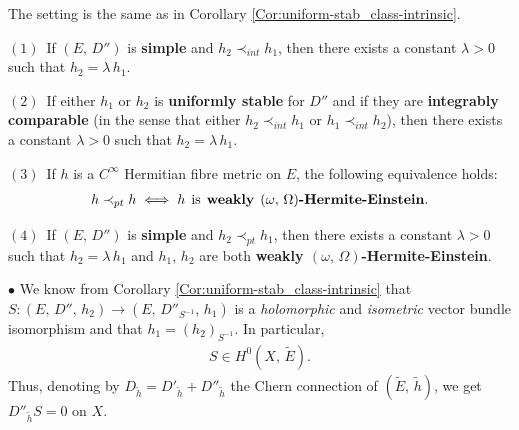 \documentclass[12pt]{article}
\begin{document}
\begin{The}\label{The:h_1-h_2_comparison_proportinality} The setting is the same as in Corollary \ref{Cor:uniform-stab_class-intrinsic}.

\vspace{1ex}

$(1)$\, If $(E,\,D'')$ is {\bf simple} and $h_2\prec_{int} h_1$, then there exists a constant $\lambda>0$ such that $h_2 = \lambda\,h_1$.

\vspace{1ex}

$(2)$\, If either $h_1$ or $h_2$ is {\bf uniformly stable} for $D''$ and if they are {\bf integrably comparable} (in the sense that either $h_2\prec_{int} h_1$ or $h_1\prec_{int} h_2$), then there exists a constant $\lambda>0$ such that $h_2 = \lambda\,h_1$.

\vspace{1ex}

$(3)$\, If $h$ is a $C^\infty$ Hermitian fibre metric on $E$, the following equivalence holds: \begin{eqnarray}\label{eqn:h_prec_h_H-E}h\prec_{pt} h \iff h \hspace{1ex} \mbox{is} \hspace{1ex} \mbox{\bf weakly} \hspace{1ex} (\omega,\,\Omega)\mbox{\bf -Hermite-Einstein}.\end{eqnarray}

\vspace{1ex}

$(4)$\, If $(E,\,D'')$ is {\bf simple} and $h_2\prec_{pt} h_1$, then there exists a constant $\lambda>0$ such that $h_2 = \lambda\,h_1$ and $h_1$, $h_2$ are both {\bf weakly $(\omega,\,\Omega)$-Hermite-Einstein}.


\end{The}

 $\bullet$ We know from Corollary \ref{Cor:uniform-stab_class-intrinsic} that $S:(E,\,D'',\,h_2)\longrightarrow(E,\,D''_{S^{-1}},\,h_1)$ is a {\it holomorphic} and {\it isometric} vector bundle isomorphism and that $h_1 = (h_2)_{S^{-1}}$. In particular, \begin{eqnarray}\label{eqn:S_hol-section_E-tilde}S\in H^0(X,\,\widetilde{E}).\end{eqnarray} Thus, denoting by $D_{\widetilde{h}} = D'_{\widetilde{h}} + D''_{\widetilde{h}}$ the Chern connection of $(\widetilde{E},\,\widetilde{h})$, we get $D''_{\widetilde{h}} S =0$ on $X$.
\end{document}
